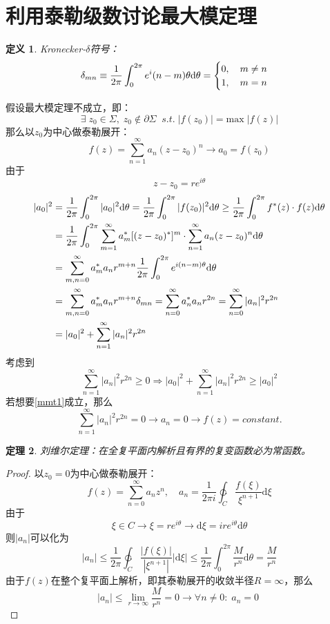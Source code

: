\documentclass[10pt, a4paper, oneside]{ctexbook}
\newtheorem{theorem}{定理}[section]
\newtheorem{definition}[theorem]{定义}
\def\D{\mathrm{d}}
\newcommand{\F}[1][z]
{\ensuremath{f(#1)}}
\begin{document}
\section{利用泰勒级数讨论最大模定理}
\begin{definition}
    Kronecker-$\delta$符号：
    \begin{equation}
        \delta_{mn}\equiv\frac{1}{2\pi}\int_0^{2\pi}e^i(n-m)\theta \D \theta=\begin{aligned}
            \notag
            \begin{cases}
                0,\quad m\ne n\\ 1,\quad m=n
            \end{cases}
        \end{aligned}
    \end{equation}
\end{definition}
假设最大模定理不成立，即：$$
\exists\;z_0\in\Sigma,\;z_0\notin \partial \Sigma\;\; s.t.\;|\F[z_0]|=\mathrm{max}\;|\F|
$$
那么以$z_0$为中心做泰勒展开：
$$
\F=\sum_{n=1}^\infty a_n (z-z_0)^n\to a_0=\F[z_0]
$$
由于
$$
z-z_0=re^{i\theta}
$$
\begin{align}
    |a_0|^2&=\frac{1}{2\pi} \int_{0}^{2\pi} |a_0|^2\D \theta=\frac{1}{2\pi}\int_0^{2\pi}|f(z_0)|^2 \D \theta\ge\frac{1}{2\pi}\int_0^{2\pi}f^*(z)\cdot f(z) \D \theta \notag\\ \notag
    &=\frac{1}{2\pi}\int_0^{2\pi}\sum_{m=1}^\infty a_m^* [(z-z_0)^*]^m\cdot \sum_{n=1}^\infty a_n (z-z_0)^n \D \theta\\\notag
    &=\sum_{m,n=0}^\infty a^*_m a_n r^{m+n}\frac{1}{2\pi} \int_0^{2\pi} e^{i(n-m)\theta}\D \theta \\\notag
    &=\sum_{m,n=0}^\infty a^*_m a_n r^{m+n}\delta_{mn}=\sum_{n=0}^\infty a^*_na_n r^{2n}=\sum_{n=0}^\infty |a_n|^2 r^{2n}\\
    &=|a_0|^2+\sum_{n=1}^\infty |a_n|^2r^{2n} \label{mmt1}
\end{align}
考虑到
$$
\sum_{n=1}^\infty |a_n|^2r^{2n}\ge 0 \Rightarrow |a_0|^2+\sum_{n=1}^\infty |a_n|^2r^{2n} \ge |a_0|^2
$$
若想要\ref{mmt1}成立，那么
$$
\sum_{n=1}^\infty |a_n|^2r^{2n} =0 \to a_n = 0 \to \F = constant.
$$
\begin{theorem}
    刘维尔定理：在全复平面内解析且有界的复变函数必为常函数。
\end{theorem}
\begin{proof}
    以$z_0=0$为中心做泰勒展开：
    $$
    \F = \sum_{n=0}^\infty a_n z^n,\quad a_n=\frac{1}{2\pi i}\ointctrclockwise_C \frac{\F[\xi]}{\xi^{n+1}}\D \xi
    $$
    由于$$
    \xi \in C\to \xi = re^{i\theta}\to \D \xi = ire^{i\theta} \D \theta
    $$
    则$|a_n|$可以化为
    $$
    |a_n|\le \frac{1}{2\pi}\ointctrclockwise_C \frac{|\F[\xi]|}{|\xi^{n+1}|}|\D \xi| \le \frac{1}{2\pi}\int_0^{2\pi} \frac{M}{r^{n}}\D \theta = \frac{M}{r^n}
    $$
    由于$\F$在整个复平面上解析，即其泰勒展开的收敛半径$R=\infty$，那么
    $$
    |a_n|\le \lim_{r\to \infty} \frac{M}{r^n} = 0 \to  \forall n\ne 0:\;a_n=0\;
    $$
\end{proof}
\end{document}
